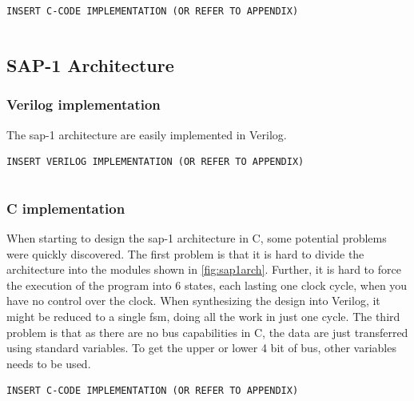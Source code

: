 \begin{verbatim}
INSERT C-CODE IMPLEMENTATION (OR REFER TO APPENDIX)
\end{verbatim}

\lstset{language=C,style=Cstyle}
\begin{lstlisting}[caption={FIR-filter implemented in C},label=lst:firfilterc]

\end{lstlisting}


\subsection{SAP-1 Architecture}

\subsubsection{Verilog implementation}
The \gls{sap-1} architecture are easily implemented in Verilog. 
\begin{verbatim}
INSERT VERILOG IMPLEMENTATION (OR REFER TO APPENDIX)
\end{verbatim}
\begin{lstlisting}[caption={FIR-filter implemented in C},label=lst:fsap1archverilog]

\end{lstlisting}
\subsubsection{C implementation}
When starting to design the \gls{sap-1} architecture in C, some potential problems were quickly discovered. The first problem is that it is hard to divide the architecture into the modules shown in \cref{fig:sap1arch}. Further, it is hard to force the execution of the program into 6 states, each lasting one clock cycle, when you have no control over the clock. When synthesizing the design into Verilog, it might be reduced to a single \gls{fsm}, doing all the work in just one cycle. The third problem is that as there are no bus capabilities in C, the data are just transferred using standard variables. To get the upper or lower 4 bit of bus, other variables needs to be used. 

\begin{verbatim}
INSERT C-CODE IMPLEMENTATION (OR REFER TO APPENDIX)
\end{verbatim}
\begin{lstlisting}[caption={SAP-1 architecture implemented in C},label=lst:sap1archc]

\end{lstlisting}